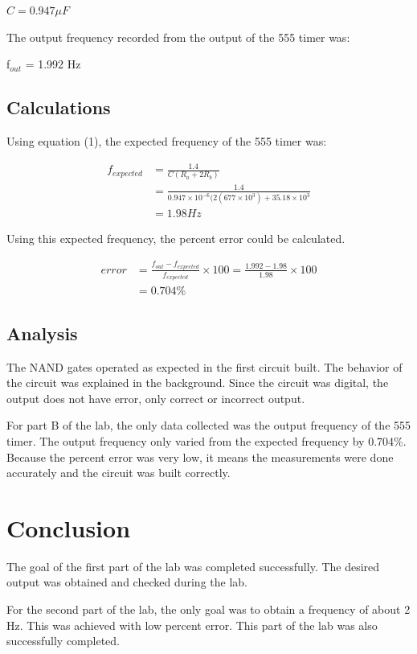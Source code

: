 \documentclass[twocolumn, amsmath]{revtex4}
\begin{document}
\noindent $C = 0.947 \mu F$

The output frequency recorded from the output of the 555 timer was:

f$_{out}$ = 1.992 Hz


\subsection{Calculations}

Using equation (1), the expected frequency of the 555 timer was:

\begin{equation*}\label{eq:pareto mle2}
\begin{aligned}
f_{expected} &= \frac{1.4}{C(R_a + 2R_b)}\\ &= \frac{1.4}{0.947\times 10^{-6}(2(677\times 10^3) + 35.18\times 10^3}\\ &= 1.98 Hz
\end{aligned}
\end{equation*}

\noindent Using this expected frequency, the percent error could be calculated.

\begin{equation*}\label{eq:pareto mle2}
\begin{aligned}
error &= \frac{f_{out} - f_{expected}}{f_{expected}}\times100 = \frac{1.992 - 1.98}{1.98}\times100 \\ &= 0.704\%
\end{aligned}
\end{equation*}


\subsection{Analysis}

The NAND gates operated as expected in the first circuit built. The behavior of the circuit was explained in the background. Since the circuit was digital, the output does not have error, only correct or incorrect output.

For part B of the lab, the only data collected was the output frequency of the 555 timer. The output frequency only varied from the expected frequency by 0.704\%. Because the percent error was very low, it means the measurements were done accurately and the circuit was built correctly.


\section{Conclusion}

The goal of the first part of the lab was completed successfully. The desired output was obtained and checked during the lab.

For the second part of the lab, the only goal was to obtain a frequency of about 2 Hz. This was achieved with low percent error. This part of the lab was also successfully completed.
\end{document}
